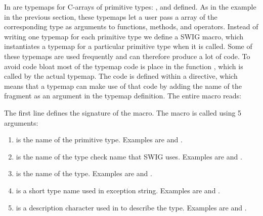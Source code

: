 In  are typemaps for C-arrays of primitive
types: ,  and  defined. As in
the  example in the previous section, these typemaps let a
user pass a \numpy array of the corresponding type as arguments to
functions, methods, and operators. Instead of writing one typemap for
each primitive type we define a SWIG macro, which instantiates a
typemap for a particular primitive type when it is called. Some of these
typemaps are used frequently and can therefore produce a lot of
code. To avoid code bloat most of the typemap code is place in the
function
\-, which
is called by the actual typemap. The code is defined within a
 directive, which means that a typemap can make use of
that code by adding the name of the fragment as an argument in the
typemap definition. The entire macro reads:
The first line defines the signature of the macro. The macro is called
using 5 arguments:
\begin{enumerate}
\item {} is the name of the primitive type. Examples are
 and .

\item {} is the name of the type check name that SWIG uses. Examples
are  and .

\item {} is the name of the \numpy type. Examples are
 and .

\item {} is a short type name used in exception string.
Examples are  and .

\item {} is a description character used in \numpy to describe the
type. Examples are  and .
\end{enumerate}
